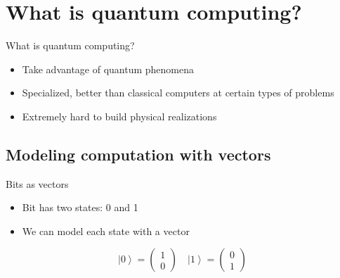 \documentclass[14pt]{beamer}
\newcommand{\braket}[1]{\ensuremath{\left | #1 \right \rangle}}
\begin{document}
\section{What is quantum computing?}
\begin{frame}{What is quantum computing?}
\begin{itemize}
	\item Take advantage of quantum phenomena	
	\item Specialized, better than classical computers at certain types of problems
	\item Extremely hard to build physical realizations
\end{itemize}
\end{frame}

\subsection{Modeling computation with vectors}
\begin{frame}{Bits as vectors}
\begin{itemize}
	\item Bit has two states: 0 and 1
	\item We can model each state with a vector
\end{itemize}
$$\braket{0} = \begin{pmatrix}1\\ 0\end{pmatrix} \quad \braket{1}=\begin{pmatrix}0\\ 1\end{pmatrix}$$
\end{frame}
\end{document}

